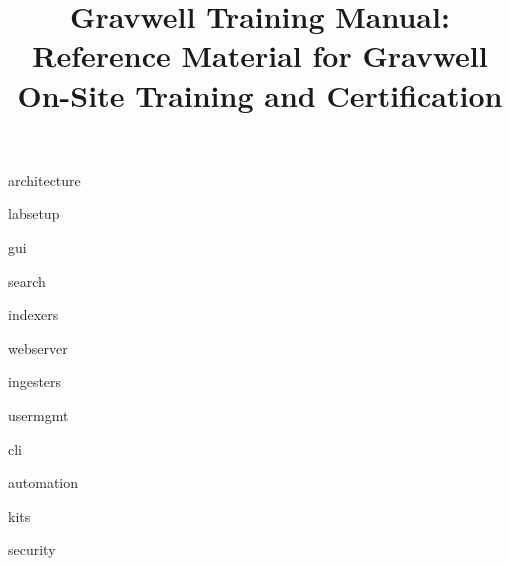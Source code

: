 \documentclass[]{report}
\date{}
\newcommand{\titlepicture}[2][]{%
  \renewcommand\placetitlepicture{%
    \texttt{[image: \#2]}\par\medskip
  }%
}
\newcommand{\placetitlepicture}{} %
\begin{document}
\titlepicture{img/logo.png}
\title{Gravwell Training Manual: Reference Material for Gravwell On-Site Training and Certification}
\maketitle

\newpage

\tableofcontents
\newpage




{architecture}

{labsetup}

{gui}

{search}

{indexers}

{webserver}

{ingesters}

{usermgmt}

{cli}

{automation}

{kits}

{security}

\end{document}
